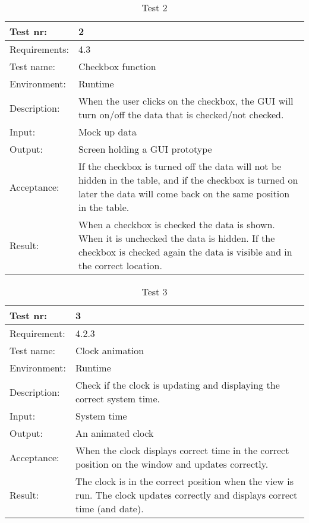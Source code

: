 \documentclass[../document.tex]{subfiles}
\begin{document}
\begin{table}[H]
\caption{Test 2}
\begin{tabularx}{\textwidth}{|l|X|}
\hline
Test nr:
&2
\\ \hline Requirements:
&4.3
\\ \hline Test name:
&Checkbox function
\\ \hline Environment:
&Runtime
\\ \hline Description:
&When the user clicks on the checkbox, the GUI will turn on/off the data that is checked/not checked.
\\ \hline Input:
&Mock up data
\\ \hline Output:
&Screen holding a GUI prototype
\\ \hline Acceptance:
&If the checkbox is turned off the data will not be hidden in the table, and if the checkbox is turned on later the data will come back on the same position in the table.
\\ \hline Result:
&When a checkbox is checked the data is shown. When it is unchecked the data is hidden. If the checkbox is checked again the data is visible and in the correct location.
\\ \hline
\end{tabularx}
\end{table}

\begin{table}[H]
\caption{Test 3}
\begin{tabularx}{\textwidth}{|l|X|}
\hline
Test nr:
&3
\\ \hline Requirement:
&4.2.3
\\ \hline Test name:
&Clock animation
\\ \hline Environment:
&Runtime
\\ \hline Description:
&Check if the clock is updating and displaying the correct system time.
\\ \hline Input:
&System time
\\ \hline Output:
&An animated clock
\\ \hline Acceptance:
&When the clock displays correct time in the correct position on the window and updates correctly.
\\ \hline Result:
&The clock is in the correct position when the view is run. The clock updates correctly and displays correct time (and date).
\\ \hline
\end{tabularx}
\end{table}
\end{document}
